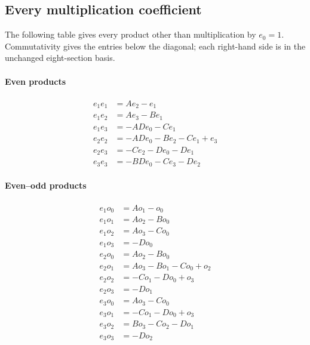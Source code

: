 \subsection{Every multiplication coefficient}
The following table gives every product other than multiplication by $e_0=1$.
Commutativity gives the entries below the diagonal; each right-hand side is in the unchanged eight-section basis.
\paragraph{Even products}
\begin{align}
e_1 e_1 &=A e_{2} - e_{1}\tag{GB13a}\\
e_1 e_2 &=A e_{3} - B e_{1}\tag{GB13b}\\
e_1 e_3 &=- A D e_{0} - C e_{1}\tag{GB13c}\\
e_2 e_2 &=- A D e_{0} - B e_{2} - C e_{1} + e_{3}\tag{GB13d}\\
e_2 e_3 &=- C e_{2} - D e_{0} - D e_{1}\tag{GB13e}\\
e_3 e_3 &=- B D e_{0} - C e_{3} - D e_{2}\tag{GB13f}
\end{align}
\paragraph{Even--odd products}
\begin{align}
e_1 o_0 &=A o_{1} - o_{0}\tag{GB14a}\\
e_1 o_1 &=A o_{2} - B o_{0}\tag{GB14b}\\
e_1 o_2 &=A o_{3} - C o_{0}\tag{GB14c}\\
e_1 o_3 &=- D o_{0}\tag{GB14d}\\
e_2 o_0 &=A o_{2} - B o_{0}\tag{GB14e}\\
e_2 o_1 &=A o_{3} - B o_{1} - C o_{0} + o_{2}\tag{GB14f}\\
e_2 o_2 &=- C o_{1} - D o_{0} + o_{3}\tag{GB14g}\\
e_2 o_3 &=- D o_{1}\tag{GB14h}\\
e_3 o_0 &=A o_{3} - C o_{0}\tag{GB14i}\\
e_3 o_1 &=- C o_{1} - D o_{0} + o_{3}\tag{GB14j}\\
e_3 o_2 &=B o_{3} - C o_{2} - D o_{1}\tag{GB14k}\\
e_3 o_3 &=- D o_{2}\tag{GB14l}
\end{align}
